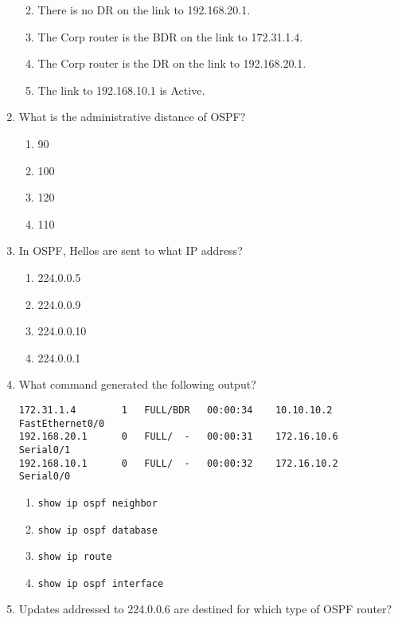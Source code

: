 \begin{enumerate}
  \begin{enumerate}
  \def\labelenumii{\Alph{enumii}.}
  \tightlist
  \item
    There is no DR on the link to 192.168.20.1.
  \item
    The Corp router is the BDR on the link to 172.31.1.4.
  \item
    The Corp router is the DR on the link to 192.168.20.1.
  \item
    The link to 192.168.10.1 is Active.
  \end{enumerate}
\item
  What is the administrative distance of OSPF?

  \begin{enumerate}
  \def\labelenumii{\Alph{enumii}.}
  \tightlist
  \item
    90
  \item
    100
  \item
    120
  \item
    110
  \end{enumerate}
\item
  In OSPF, Hellos are sent to what IP address?

  \begin{enumerate}
  \def\labelenumii{\Alph{enumii}.}
  \tightlist
  \item
    224.0.0.5
  \item
    224.0.0.9
  \item
    224.0.0.10
  \item
    224.0.0.1
  \end{enumerate}
\item
  What command generated the following output?

\begin{verbatim}
172.31.1.4        1   FULL/BDR   00:00:34    10.10.10.2     FastEthernet0/0
192.168.20.1      0   FULL/  -   00:00:31    172.16.10.6     Serial0/1
192.168.10.1      0   FULL/  -   00:00:32    172.16.10.2     Serial0/0
\end{verbatim}

  \begin{enumerate}
  \def\labelenumii{\Alph{enumii}.}
  \tightlist
  \item
    \texttt{show\ ip\ ospf\ neighbor}
  \item
    \texttt{show\ ip\ ospf\ database}
  \item
    \texttt{show\ ip\ route}
  \item
    \texttt{show\ ip\ ospf\ interface}
  \end{enumerate}
\item
  Updates addressed to 224.0.0.6 are destined for which type of OSPF
  router?


\end{enumerate}

